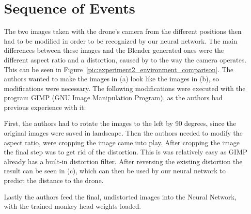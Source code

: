 \section{Sequence of Events}
The two images taken with the drone's camera from the different positions then had to be modified in order to be recognized by our neural network. The main differences between these images and the Blender generated ones were the different aspect ratio and a distortion, caused by to the way the camera operates. This can be seen in Figure~\ref{pic:experiment2_environment_comparison}. The authors wanted to make the images in (a) look like the images in (b), so modifications were necessary. The following modifications were executed with the program GIMP (GNU Image Manipulation Program), as the authors had previous experience with it:

First, the authors had to rotate the images to the left by 90 degrees, since the original images were saved in landscape. Then the authors needed to modify the aspect ratio, were cropping the image came into play. After cropping the image the final step was to get rid of the distortion. This is was relatively easy as GIMP already has a built-in distortion filter. After reversing the existing distortion the result can be seen in (c), which can then be used by our neural network to predict the distance to the drone.

Lastly the authors feed the final, undistorted images into the Neural Network, with the trained monkey head weights loaded.

